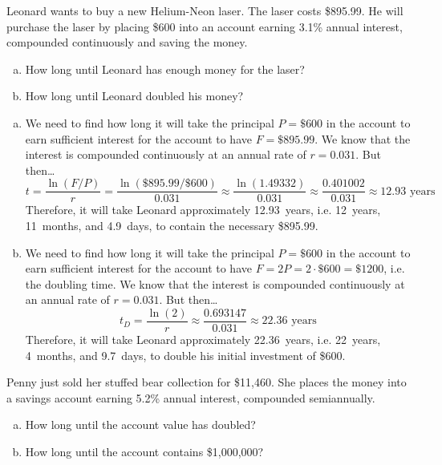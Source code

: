 \documentclass[11pt,letterpaper]{article}
\begin{document}
\newpage



 Leonard wants to buy a new Helium-Neon laser. The laser costs \$895.99. He will purchase the laser by placing \$600 into an account earning 3.1\% annual interest, compounded continuously and saving the money. 
	\begin{enumerate}[(a)]
	\item How long until Leonard has enough money for the laser?
	\item How long until Leonard doubled his money?
	\end{enumerate} \pspace

\sol 
\begin{enumerate}[(a)]
\item We need to find how long it will take the principal $P= \$600$ in the account to earn sufficient interest for the account to have $F= \$895.99$. We know that the interest is compounded continuously at an annual rate of $r= 0.031$. But then\dots
	\[
	t= \dfrac{\ln(F/P)}{r}= \dfrac{\ln(\$895.99/\$600)}{0.031} \approx \dfrac{\ln(1.49332)}{0.031} \approx \dfrac{0.401002}{0.031} \approx 12.93 \text{ years}
	\]
Therefore, it will take Leonard approximately 12.93~years, i.e. 12~years, 11~months, and 4.9~days, to contain the necessary \$895.99. \pspace

\item We need to find how long it will take the principal $P= \$600$ in the account to earn sufficient interest for the account to have $F= 2P= 2 \cdot \$600= \$1200$, i.e. the doubling time. We know that the interest is compounded continuously at an annual rate of $r= 0.031$. But then\dots
	\[
	t_D= \dfrac{\ln(2)}{r} \approx \dfrac{0.693147}{0.031} \approx 22.36 \text{ years}
	\]
Therefore, it will take Leonard approximately 22.36~years, i.e. 22~years, 4~months, and 9.7~days, to double his initial investment of \$600. 
\end{enumerate}



\newpage



 Penny just sold her stuffed bear collection for \$11,460. She places the money into a savings account earning 5.2\% annual interest, compounded semiannually. 
	\begin{enumerate}[(a)]
	\item How long until the account value has doubled?
	\item How long until the account contains \$1,000,000?
	\end{enumerate} \pspace
\end{document}
